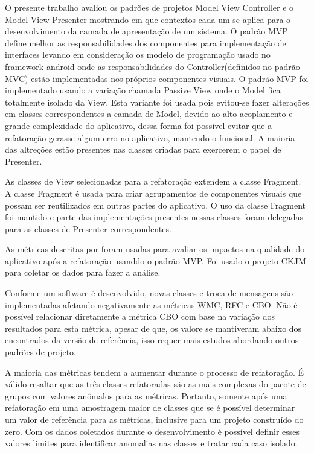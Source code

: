 \documentclass[conference]{IEEEtran}
\begin{document}
O presente trabalho avaliou os padrões de projetos Model View Controller e o
Model View Presenter mostrando em que contextos cada um se aplica para o
desenvolvimento da camada de apresentação de um sistema.
O padrão MVP define melhor as responsabilidades dos componentes para
implementação de interfaces levando em consideração os modelo de programação
usado no framework android onde as responsabilidades do Controller(definidos no
padrão MVC) estão implementadas nos próprios componentes visuais. O padrão MVP
foi implementado usando a variação chamada Passive View onde o Model fica
totalmente isolado da View. Esta variante foi usada pois evitou-se fazer
alterações em classes correspondentes a camada de Model, devido ao alto
acoplamento e grande complexidade do aplicativo, dessa forma foi possível evitar
que a refatoração gerasse algum erro no aplicativo, mantendo-o funcional. A
maioria das altreções estão presentes nas classes criadas para exercerem o papel
de Presenter.

As classes de View selecionadas para a refatoração extendem a classe Fragment.
A classe Fragment é usada para criar agrupamentos de componentes visuais que
possam ser reutilizados em outras partes do aplicativo. O uso da classe
Fragment foi mantido e parte das implementações presentes nessas classes foram
delegadas para as classes de Presenter correspondentes.

As métricas descritas por \cite{cksuite} foram usadas para avaliar os
impactos na qualidade do aplicativo após a refatoração usanddo o padrão MVP. Foi
usado o projeto CKJM para coletar os dados para fazer a análise.

Conforme um software é desenvolvido, novas classes e troca de mensagens são
implementadas afetando negativamente as métricas WMC, RFC e CBO. Não é possível
relacionar diretamente a métrica CBO com base na variação dos resultados para
esta métrica, apesar de que, os valore se mantiveram abaixo dos encontrados da
versão de referência, isso requer mais estudos abordando outros padrões de projeto.

A maioria das métricas tendem a aumentar durante o processo de refatoração. 
É válido resaltar que as três classes refatoradas são as mais complexas do
pacote de grupos com valores anômalos para as métricas. Portanto, somente após
uma refatoração em uma amostragem maior de classes que se é possível determinar
um valor de referência para as métricas, inclusive para um projeto construído
do zero. Com os dados coletados durante o desenvolvimento é possível definir
esses valores limites para identificar anomalias nas classes e tratar cada caso
isolado.
\end{document}
